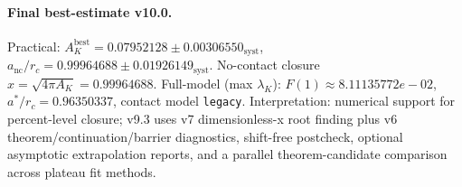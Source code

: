 \paragraph{Final best-estimate v10.0.}
Practical: $A_K^{\mathrm{best}} = 0.07952128 \pm 0.00306550_{\mathrm{syst}}$, $a_{\mathrm{nc}}/r_c = 0.99964688 \pm 0.01926149_{\mathrm{syst}}$.
No-contact closure $x = \sqrt{4\pi A_K} = 0.99964688$.
Full-model (max $\lambda_K$): $F(1) \approx 8.11135772e-02$, $a^*/r_c = 0.96350337$, contact model \texttt{legacy}.
Interpretation: numerical support for percent-level closure; v9.3 uses v7 dimensionless-x root finding plus v6 theorem/continuation/barrier diagnostics, shift-free postcheck, optional asymptotic extrapolation reports, and a parallel theorem-candidate comparison across plateau fit methods.
